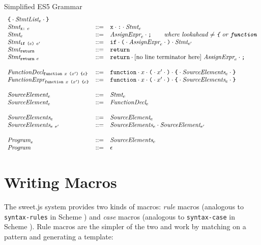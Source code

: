 \documentclass[preprint,10pt]{sigplanconf}
\begin{document}
\begin{displayfigure*}{\label{fig:grammar}Simplified ES5 Grammar}
\[\begin{array}{lcl}
  \texttt{\{}\cdot \textit{StmtList}_{e}\cdot\texttt{\}} 
  \\
  \textit{Stmt}_{\texttt{x}\texttt{:}~e} &::=&
  \texttt{x}\cdot \texttt{:}\cdot\textit{Stmt}_{e}
  \\
  \textit{Stmt}_{e} &::=& 
  \textit{AssignExpr}_{e} \cdot \texttt{;}
  \qquad  \textit{where lookahead \( \not =
    \texttt{\{} \) or \( \texttt{function} \)}
  \\
  \textit{Stmt}_{\texttt{if}~\texttt{(}e\texttt{)}~e'} &::=& 
  \texttt{if}\cdot 
  \texttt{(}\cdot \textit{AssignExpr}_{e} \cdot \texttt{)}\cdot \textit{Stmt}_{e'}
  \\
  \textit{Stmt}_{\texttt{return}} &::=& 
  \texttt{return}
  \\
  \textit{Stmt}_{\texttt{return}~e} &::=& 
  \texttt{return}\cdot \textrm{[no line terminator
    here]}~\textit{AssignExpr}_{e}\cdot \texttt{;}
  \\ \\
  \textit{FunctionDecl}_{\texttt{function}~x~\texttt{(}x'\texttt{)}~\texttt{\{}e\texttt{\}}} 
  &::=&
  \texttt{function} \cdot x \cdot \texttt{(} \cdot x' \cdot\texttt{)}\cdot
  \texttt{\{}\cdot \textit{SourceElements}_{e} \cdot\texttt{\}}
  \\
  \textit{FunctionExpr}_{\texttt{function}~x~\texttt{(}x'\texttt{)}~\texttt{\{}e\texttt{\}}} 
  &::=&
  \texttt{function} \cdot x \cdot \texttt{(} \cdot x' \cdot\texttt{)}\cdot
  \texttt{\{}\cdot \textit{SourceElements}_{e} \cdot\texttt{\}}
  \\ \\
  \textit{SourceElement}_{e} &::=& \textit{Stmt}_{e} 
  \\
  \textit{SourceElement}_{e} &::=& \textit{FunctionDecl}_{e}
  \\ \\

  \textit{SourceElements}_{e} &::=& \textit{SourceElement}_{e}
  \\
  \textit{SourceElements}_{e~e'} &::=&
  \textit{SourceElements}_{e}\cdot \textit{SourceElement}_{e'}
  \\ \\
  \textit{Program}_{e} &::=& \textit{SourceElements}_{e}
  \\
  \textit{Program}_{} &::=& \epsilon
\end{array}
\]  
\end{displayfigure*}

\section{Writing Macros}
\label{sec:writingMacros}

The sweet.js system provides two kinds of macros: \emph{rule} macros
(analogous to \verb!syntax-rules! in Scheme \cite{Clinger1991})
and \emph{case} macros (analogous to \verb!syntax-case! in
Scheme \cite{Hieb1992}). Rule macros are the simpler of the two and work by matching
on a pattern and generating a template:
\end{document}
